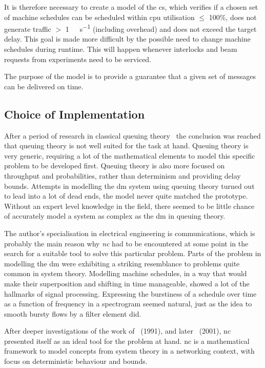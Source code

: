 It is therefore necessary to create a model of the  \gls{cs}, which verifies if a chosen set of machine schedules
can be scheduled within \gls{cpu} utilisation $\le$ 100\%, does not generate traffic $>$ \SI{1}{\giga\bit\per\second} (including overhead)
and does not exceed the target delay. This goal is made more difficult by the possible need to change machine schedules during runtime.
This will happen whenever interlocks and beam requests from experiments need to be serviced.
\par
The purpose of the model is to provide a guarantee that a given set of messages can be delivered on time.


\subsection{Choice of Implementation}
After a period of research in classical queuing theory~\cite{yue_advances_2009, daigle_queueing_2005}
the conclusion was reached that queuing theory is not well suited for the task at hand. Queuing theory is very generic, requiring a lot of the mathematical elements to model this specific problem
to be developed first. Queuing theory is also more focused on throughput and probabilities, rather than determinism and providing delay bounds.
Attempts in modelling the \gls{dm} system using queuing theory turned out to lead into a lot of dead ends, the model never quite matched the prototype.
Without an expert level knowledge in the field, there seemed to be little chance of accurately model a system as complex as the \gls{dm} in queuing theory.
\par
The author's specialisation in electrical engineering is communications, which is probably the main reason
why \emph{\gls{nc}} had to be encountered at some point in the search for a suitable tool to solve this particular problem. Parts of the problem in modelling the \gls{dm}
were exhibiting a striking resemblance to problems quite common in system theory. Modelling machine schedules, in a way that would make their
superposition and shifting in time manageable, showed a lot of the hallmarks of signal processing. Expressing the burstiness of
a schedule over time as a function of frequency in a spectrogram seemed natural, just as the idea to smooth bursty flows by a filter element did.
\par
After deeper investigations of the work of~\cite{cruz_calculus_1991} (1991), and later~\cite{thiran_network_2001} (2001), \gls{nc} presented itself as an ideal tool for the problem at hand.
\gls{nc} is a mathematical framework to model concepts from system theory in a networking context,
with focus on deterministic behaviour and bounds.

